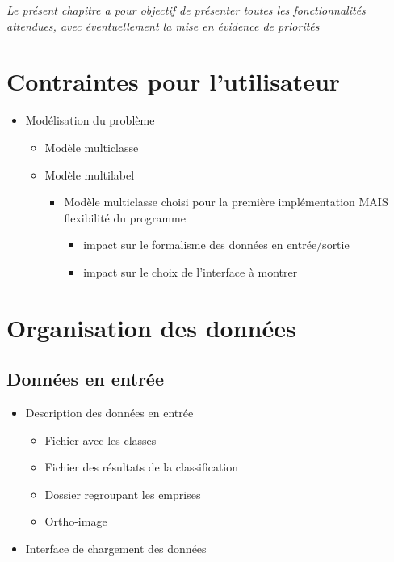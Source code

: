
\textit{Le présent chapitre a pour objectif de présenter toutes les fonctionnalités attendues, avec éventuellement la mise en évidence de priorités}

\section{Contraintes pour l'utilisateur}

\begin{itemize}
	\item Modélisation du problème 
	\begin{itemize}
		\item Modèle multiclasse
		\item Modèle multilabel
		\begin{itemize}
			\item Modèle multiclasse choisi pour la première implémentation MAIS flexibilité du programme
			\begin{itemize}
				\item impact sur le formalisme des données en entrée/sortie
				\item impact sur le choix de l'interface à montrer
			\end{itemize}
		\end{itemize}
	\end{itemize}
\end{itemize}

\section{Organisation des données}

\subsection{Données en entrée}

\begin{itemize}
	\item Description des données en entrée
	\begin{itemize}
		\item Fichier avec les classes
		\item Fichier des résultats de la classification
		\item Dossier regroupant les emprises
		\item Ortho-image
	\end{itemize}
	\item Interface de chargement des données
\end{itemize}

